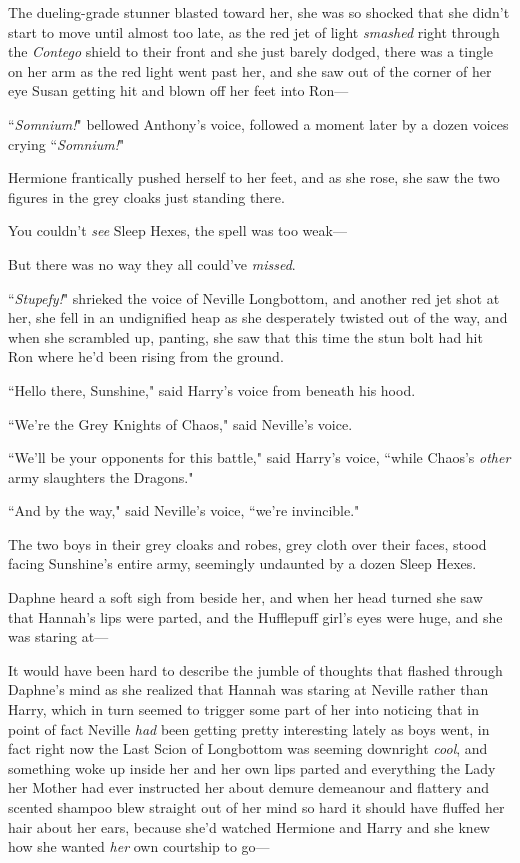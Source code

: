The dueling-grade stunner blasted toward her, she was so shocked that she didn't start to move until almost too late, as the red jet of light \emph{smashed} right through the \emph{Contego} shield to their front and she just barely dodged, there was a tingle on her arm as the red light went past her, and she saw out of the corner of her eye Susan getting hit and blown off her feet into Ron—

``\emph{Somnium!}" bellowed Anthony's voice, followed a moment later by a dozen voices crying ``\emph{Somnium!}"

Hermione frantically pushed herself to her feet, and as she rose, she saw the two figures in the grey cloaks just standing there.

You couldn't \emph{see} Sleep Hexes, the spell was too weak—

But there was no way they all could've \emph{missed}.

``\emph{Stupefy!}" shrieked the voice of Neville Longbottom, and another red jet shot at her, she fell in an undignified heap as she desperately twisted out of the way, and when she scrambled up, panting, she saw that this time the stun bolt had hit Ron where he'd been rising from the ground.

``Hello there, Sunshine," said Harry's voice from beneath his hood.

``We're the Grey Knights of Chaos," said Neville's voice.

``We'll be your opponents for this battle," said Harry's voice, ``while Chaos's \emph{other} army slaughters the Dragons."

``And by the way," said Neville's voice, ``we're invincible."

\later

The two boys in their grey cloaks and robes, grey cloth over their faces, stood facing Sunshine's entire army, seemingly undaunted by a dozen Sleep Hexes.

Daphne heard a soft sigh from beside her, and when her head turned she saw that Hannah's lips were parted, and the Hufflepuff girl's eyes were huge, and she was staring at—

It would have been hard to describe the jumble of thoughts that flashed through Daphne's mind as she realized that Hannah was staring at Neville rather than Harry, which in turn seemed to trigger some part of her into noticing that in point of fact Neville \emph{had} been getting pretty interesting lately as boys went, in fact right now the Last Scion of Longbottom was seeming downright \emph{cool}, and something woke up inside her and her own lips parted and everything the Lady her Mother had ever instructed her about demure demeanour and flattery and scented shampoo blew straight out of her mind so hard it should have fluffed her hair about her ears, because she'd watched Hermione and Harry and she knew how she wanted \emph{her} own courtship to go—

